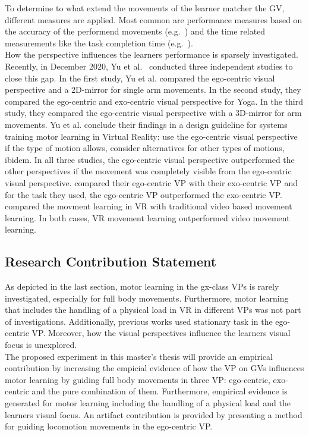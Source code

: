 To determine to what extend the movements of the learner matcher the GV, different measures are applied. Most common are performance measures based on the accuracy of the performend movements (e.g.~\cite{YouMove,thaichichua,vrdancetrainer,onebody,lightguide,physioathome}) and the time related measurements like the task completion time (e.g.~\cite{lightguide,onebody}).\\
How the perspective influences the learners performance is sparsely investigated. Recently, in December 2020, Yu et al.~\cite{perspectivematters} conducted three independent studies to close this gap. In the first study, Yu et al. compared the ego-centric visual perspective and a 2D-mirror for single arm movements. In the second study, they compared the ego-centric and exo-centric visual perspective for Yoga. In the third study, they compared the ego-centric visual perspective with a 3D-mirror for arm movements. Yu et al. conclude their findings in a design guideline for systems training motor learning in Virtual Reality: use the ego-centric visual perspective if the type of motion allows, consider alternatives for other types of motions, ibidem. In all three studies, the ego-centric visual perspective outperformed the other perspectives if the movement was completely visible from the ego-centric visual perspective. \cite{onebody,lightguide} compared their ego-centric VP with their exo-centric VP and for the task they used, the ego-centric VP outperformed the exo-centric VP. \cite{YouMove,vrdancetrainer} compared the movment learning in VR with traditional video based movement learning. In both cases, VR movement learning outperformed video movement learning.\\

\subsection{Research Contribution Statement}
\label{sec:delimination_contribution}
As depicted in the last section, motor learning in the gx-class VPs is rarely investigated, especially for full body movements. Furthermore, motor learning that includes the handling of a physical load in VR in different VPs was not part of investigations. Additionally, previous works used stationary task in the ego-centric VP. Moreover, how the visual perspectives influence the learners visual focus is unexplored.\\
The proposed experiment in this master's thesis will provide an empirical contribution by increasing the empicial evidence of how the VP on GVs influences motor learning by guiding full body movements in three VP: ego-centric, exo-centric and the pure combination of them. Furthermore, empirical evidence is generated for motor learning including the handling of a physical load and the learners visual focus. An artifact contribution is provided by presenting a method for guiding locomotion movements in the ego-centric VP. \\

